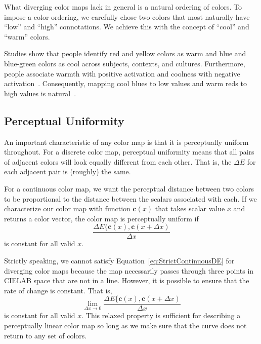 \documentclass[review,journal]{vgtc}         %
\newcommand{\lcite}[1]{~\cite{#1}}
\newcommand{\Lab}{CIELAB\xspace}
\newcommand{\DeltaE}{\ensuremath{\Delta{}E}\xspace}
\newcommand*{\cvec}[1]{\mathbf{#1}}
\begin{document}
What diverging color maps lack in general is a natural ordering of colors.
To impose a color ordering, we carefully chose two colors that most
naturally have ``low'' and ``high'' connotations.  We achieve this with the
concept of ``cool'' and ``warm'' colors.

Studies show that people identify red and yellow colors as warm and blue and
blue-green colors as cool across subjects, contexts, and
cultures.  Furthermore, people associate warmth with positive activation
and coolness with negative activation\lcite{Hardin97}.  Consequently,
mapping cool blues to low values and warm reds to high values is
natural\lcite{Fortner97}.


\subsection{Perceptual Uniformity}
\label{sec:PerceptualUniformity}

An important characteristic of any color map is that it is perceptually
uniform throughout.  For a discrete color map, perceptual uniformity means
that all pairs of adjacent colors will look equally different from each
other.  That is, the \DeltaE for each adjacent pair is (roughly) the same.

For a continuous color map, we want the perceptual distance between two
colors to be proportional to the distance between the scalars associated
with each.    If we characterize our color map with function $\cvec{c}(x)$
that takes scalar value $x$ and returns a color vector, the color map is
perceptually uniform if
\begin{equation}
  \frac{\DeltaE\{\cvec{c}(x),\cvec{c}(x+\Delta{x})}{\Delta{}x}
  \label{eq:StrictContinuousDE}
\end{equation}
is constant for all valid $x$.

Strictly speaking, we cannot satisfy Equation~\ref{eq:StrictContinuousDE}
for diverging color maps because the map necessarily passes through three
points in \Lab space that are not in a line.  However, it is possible to
ensure that the rate of change is constant.  That is,
\begin{equation}
  \lim_{\Delta{}x \rightarrow 0}{
    \frac{\DeltaE\{\cvec{c}(x),\cvec{c}(x+\Delta{x})}{\Delta{}x} }
  \label{eq:ContinuousDE}
\end{equation}
is constant for all valid $x$.  This relaxed property is sufficient for
describing a perceptually linear color map so long as we make sure that the
curve does not return to any set of colors.
\end{document}
